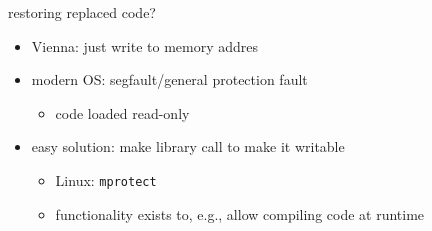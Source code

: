 
\begin{frame}{restoring replaced code?}
    \begin{itemize}
    \item Vienna: just write to memory addres
    \vspace{.5cm}
    \item modern OS: segfault/general protection fault
        \begin{itemize}
        \item code loaded read-only
        \end{itemize}
    \item easy solution: make library call to make it writable
        \begin{itemize}
        \item Linux: \texttt{mprotect}
        \item functionality exists to, e.g., allow compiling code at runtime
        \end{itemize}
    \end{itemize}
\end{frame}

